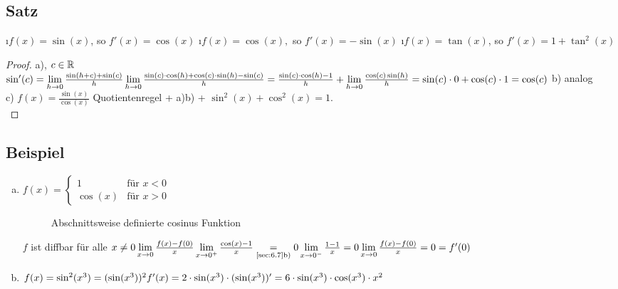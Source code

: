\subsection[Satz: Ableitungsregeln von cosinus und sinus]{Satz}
\begin{enumerate}[a)]
\i $f(x) = \sin(x)$, so $f'(x) = \cos(x)$
\i $f(x) = \cos(x),$ so $f'(x) = -\sin(x)$
\i $f(x) = \tan(x)$, so $f'(x) = 1 + \tan^2(x)$
\end{enumerate}
\begin{proof}
a), $c \in \mathbb{R}$\\
$\sin'(c) = \lim\limits_{h \to 0}\frac{\sin(h+c) + \sin(c)}{h}\\
\lim\limits_{h \to 0} \frac{\sin(c) \cdot \cos(h) + \cos(c) \cdot \sin(h) - \sin(c)}{h}\\
= \frac{\sin(c) \cdot \cos(h) -1}{h} + \lim\limits_{h \to 0} \frac{\cos(c)\sin(h)}{h} = \sin(c) \cdot 0 + \cos(c) \cdot 1 = \cos(c)$
b) analog\\
c) $f(x) = \frac{\sin(x)}{\cos(x)}$ Quotientenregel + a)b) + $\sin^2(x) + \cos^2(x) =1$.\\
\end{proof}
\subsection{Beispiel}
\begin{enumerate}[a)]
\item $f(x) = \begin{cases}
1 & \text{für }x < 0\\
\cos(x) & \text{für } x > 0
\end{cases}$\\
\begin{figure}[h!]
\centering
{}
\caption{Abschnittsweise definierte cosinus Funktion}
\end{figure}
$f$ ist diffbar für alle $ x \ne 0\\
\lim\limits_{x \to 0} \frac{f(x) - f(0)}{x}\\
\lim\limits_{x \to 0^+} \frac{\cos(x) -1}{x} \underset{\text{\ref{sec:6.7}b)}}{=} 0\\
\lim\limits_{x \to 0^-} \frac{1 -1 }{x} = 0\\
\lim\limits_{x \to 0} \frac{f(x) - f(0)}{x} = 0 = f'(0)$
\item $f(x) = \sin^2(x^3) = (\sin(x^3))^2\\
f'(x) = 2 \cdot \sin(x^3) \cdot (\sin(x^3))' = 6 \cdot \sin(x^3) \cdot \cos(x^3) \cdot x^2$\\
\end{enumerate}
